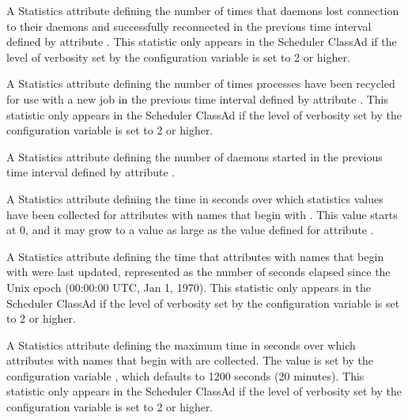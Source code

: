\begin{description}
\item[\AdAttr{RecentShadowsReconnections}:] A Statistics attribute defining
  the number of times that   daemons lost 
  connection to their  daemons and successfully reconnected
  in the previous time interval defined by attribute .
  This statistic only appears in the Scheduler ClassAd if the level of
  verbosity set by the configuration variable 
  is set to 2 or higher.
  
\item[\AdAttr{RecentShadowsRecycled}:] A Statistics attribute defining
  the number of times  
  processes have been recycled for use with a new job
  in the previous time interval defined by attribute .
  This statistic only appears in the Scheduler ClassAd if the level of
  verbosity set by the configuration variable 
  is set to 2 or higher.

\item[\AdAttr{RecentShadowsStarted}:] A Statistics attribute defining
  the number of  daemons started
  in the previous time interval defined by attribute .

\item[\AdAttr{RecentStatsLifetime}:] A Statistics attribute defining
  the time in seconds over which statistics values have been collected 
  for attributes with names that begin with .
  This value starts at 0, and it may grow to a value as large as
  the value defined for attribute . 

\item[\AdAttr{RecentStatsTickTime}:] A Statistics attribute defining
  the time that attributes with names that begin with  
  were last updated,
  represented as the number of seconds elapsed since
  the Unix epoch (00:00:00 UTC, Jan 1, 1970).
  This statistic only appears in the Scheduler ClassAd if the level of
  verbosity set by the configuration variable 
  is set to 2 or higher.

\item[\AdAttr{RecentWindowMax}:] A Statistics attribute defining
  the maximum time in seconds over which 
  attributes with names that begin with  are collected.
  The value is set by the configuration variable
  , which defaults to 1200 seconds
  (20 minutes). 
  This statistic only appears in the Scheduler ClassAd if the level of
  verbosity set by the configuration variable 
  is set to 2 or higher.


\end{description}
